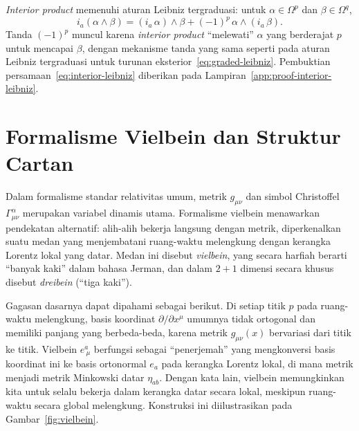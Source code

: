 \textit{Interior product} memenuhi aturan Leibniz tergraduasi: untuk $\alpha \in \Omega^p$ dan $\beta \in \Omega^q$,
\begin{equation}\label{eq:interior-leibniz}
    i_a(\alpha \wedge \beta) = (i_a\,\alpha) \wedge \beta + (-1)^p\, \alpha \wedge (i_a\,\beta).
\end{equation}
Tanda $(-1)^p$ muncul karena \textit{interior product} ``melewati'' $\alpha$ yang berderajat $p$ untuk mencapai $\beta$, dengan mekanisme tanda yang sama seperti pada aturan Leibniz tergraduasi untuk turunan eksterior~\eqref{eq:graded-leibniz}. Pembuktian persamaan~\eqref{eq:interior-leibniz} diberikan pada Lampiran~\ref{app:proof-interior-leibniz}.


\section{Formalisme Vielbein dan Struktur Cartan}
\label{sec:vielbein}

Dalam formalisme standar relativitas umum, metrik $g_{\mu\nu}$ dan simbol Christoffel $\Gamma^\alpha_{\mu\nu}$ merupakan variabel dinamis utama. Formalisme vielbein menawarkan pendekatan alternatif: alih-alih bekerja langsung dengan metrik, diperkenalkan suatu medan yang menjembatani ruang-waktu melengkung dengan kerangka Lorentz lokal yang datar. Medan ini disebut \textit{vielbein}, yang secara harfiah berarti ``banyak kaki'' dalam bahasa Jerman, dan dalam $2+1$ dimensi secara khusus disebut \textit{dreibein} (``tiga kaki'').

Gagasan dasarnya dapat dipahami sebagai berikut. Di setiap titik $p$ pada ruang-waktu melengkung, basis koordinat $\partial/\partial x^\mu$ umumnya tidak ortogonal dan memiliki panjang yang berbeda-beda, karena metrik $g_{\mu\nu}(x)$ bervariasi dari titik ke titik. Vielbein $e^a_{\ \mu}$ berfungsi sebagai ``penerjemah'' yang mengkonversi basis koordinat ini ke basis ortonormal $e_a$ pada kerangka Lorentz lokal, di mana metrik menjadi metrik Minkowski datar $\eta_{ab}$. Dengan kata lain, vielbein memungkinkan kita untuk selalu bekerja dalam kerangka datar secara lokal, meskipun ruang-waktu secara global melengkung. Konstruksi ini diilustrasikan pada Gambar~\ref{fig:vielbein}.

